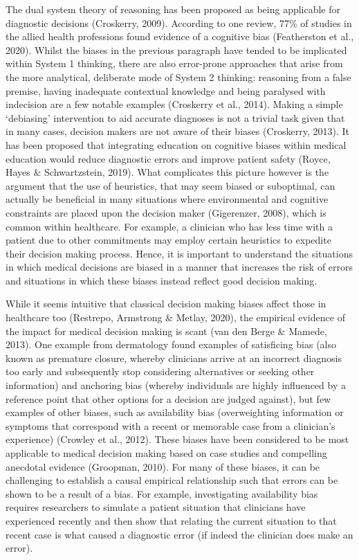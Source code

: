 \documentclass[a4paper, nobind]{templates/ociamthesis}
\begin{document}
\hfill\break
The dual system theory of reasoning has been proposed as being applicable for diagnostic decisions (Croskerry, 2009). According to one review, 77\% of studies in the allied health professions found evidence of a cognitive bias (Featherston et al., 2020). Whilst the biases in the previous paragraph have tended to be implicated within System 1 thinking, there are also error-prone approaches that arise from the more analytical, deliberate mode of System 2 thinking: reasoning from a false premise, having inadequate contextual knowledge and being paralysed with indecision are a few notable examples (Croskerry et al., 2014). Making a simple `debiasing' intervention to aid accurate diagnoses is not a trivial task given that in many cases, decision makers are not aware of their biases (Croskerry, 2013). It has been proposed that integrating education on cognitive biases within medical education would reduce diagnostic errors and improve patient safety (Royce, Hayes \& Schwartzstein, 2019). What complicates this picture however is the argument that the use of heuristics, that may seem biased or suboptimal, can actually be beneficial in many situations where environmental and cognitive constraints are placed upon the decision maker (Gigerenzer, 2008), which is common within healthcare. For example, a clinician who has less time with a patient due to other commitments may employ certain heuristics to expedite their decision making process. Hence, it is important to understand the situations in which medical decisions are biased in a manner that increases the risk of errors and situations in which these biases instead reflect good decision making.

\hfill\break
While it seems intuitive that classical decision making biases affect those in healthcare too (Restrepo, Armstrong \& Metlay, 2020), the empirical evidence of the impact for medical decision making is scant (van den Berge \& Mamede, 2013). One example from dermatology found examples of satisficing bias (also known as premature closure, whereby clinicians arrive at an incorrect diagnosis too early and subsequently stop considering alternatives or seeking other information) and anchoring bias (whereby individuals are highly influenced by a reference point that other options for a decision are judged against), but few examples of other biases, such as availability bias (overweighting information or symptoms that correspond with a recent or memorable case from a clinician's experience) (Crowley et al., 2012). These biases have been considered to be most applicable to medical decision making based on case studies and compelling anecdotal evidence (Groopman, 2010). For many of these biases, it can be challenging to establish a causal empirical relationship such that errors can be shown to be a result of a bias. For example, investigating availability bias requires researchers to simulate a patient situation that clinicians have experienced recently and then show that relating the current situation to that recent case is what caused a diagnostic error (if indeed the clinician does make an error).
\end{document}
